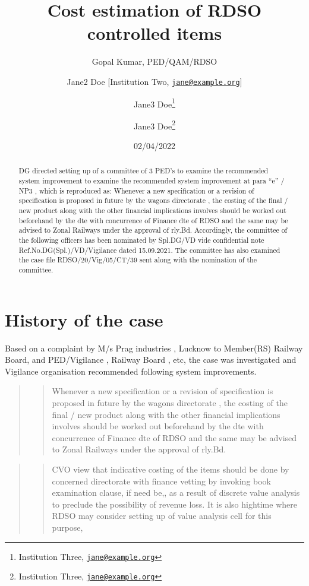 \documentclass[
  11pt,
  twoside]{article}
\title{Cost estimation of RDSO controlled items}
\author{Gopal Kumar, PED/QAM/RDSO \and Jane2 Doe {[}Institution Two, \href{mailto:jane@example.org}{\nolinkurl{jane@example.org}}{]} \and Jane3 Doe\footnote{Institution Three, \href{mailto:jane@example.org}{\nolinkurl{jane@example.org}}} \and Jane3 Doe\footnote{Institution Three, \href{mailto:jane@example.org}{\nolinkurl{jane@example.org}}}}
\date{02/04/2022}
\begin{document}
\maketitle
\begin{abstract}
DG directed setting up of a committee of 3 PED's to examine the recommended system improvement to examine the recommended system improvement at para ``e'' / NP3 , which is reproduced as: Whenever a new specification or a revision of specification is proposed in future by the wagons directorate , the costing of the final / new product along with the other financial implications involves should be worked out beforehand by the dte with concurrence of Finance dte of RDSO and the same may be advised to Zonal Railways under the approval of rly.Bd. Accordingly, the committee of the following officers has been nominated by Spl.DG/VD vide confidential note Ref.No.DG(Spl.)/VD/Vigilance dated 15.09.2021. The committee has also examined the case file RDSO/20/Vig/05/CT/39 sent along with the nomination of the committee.
\end{abstract}

{
\hypersetup{linkcolor=}
\setcounter{tocdepth}{3}
\tableofcontents
}
\tableofcontents

\hypertarget{history-of-the-case}{%
\section{History of the case}\label{history-of-the-case}}

Based on a complaint by M/s Prag industries , Lucknow to Member(RS) Railway Board, and PED/Vigilance , Railway Board , etc, the case was investigated and Vigilance organisation recommended following system improvements.

\begin{quote}
\begin{quote}
Whenever a new specification or a revision of specification is proposed in future by the wagons directorate , the costing of the final / new product along with the other financial implications involves should be worked out beforehand by the dte with concurrence of Finance dte of RDSO and the same may be advised to Zonal Railways under the approval of rly.Bd.
\end{quote}
\end{quote}

\begin{quote}
\begin{quote}
CVO view that indicative costing of the items should be done by concerned directorate with finance vetting by invoking book examination clause, if need be,, as a result of discrete value analysis to preclude the possibility of revenue loss. It is also hightime where RDSO may consider setting up of value analysis cell for this purpose,
\end{quote}
\end{quote}
\end{document}
